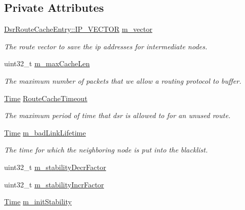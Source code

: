 \subsection*{Private Attributes}
\begin{DoxyCompactItemize}
\item 
\hyperlink{classns3_1_1dsr_1_1DsrRouteCacheEntry_ab834177006bdbfd2e3fa607c2a88cbdf}{Dsr\+Route\+Cache\+Entry\+::\+I\+P\+\_\+\+V\+E\+C\+T\+OR} \hyperlink{classns3_1_1dsr_1_1DsrRouteCache_a8f89664e7c7f0b9027462066f301f460}{m\+\_\+vector}
\begin{DoxyCompactList}\small\item\em The route vector to save the ip addresses for intermediate nodes. \end{DoxyCompactList}\item 
uint32\+\_\+t \hyperlink{classns3_1_1dsr_1_1DsrRouteCache_a7c2e4d18d325c59346bde655057682c2}{m\+\_\+max\+Cache\+Len}
\begin{DoxyCompactList}\small\item\em The maximum number of packets that we allow a routing protocol to buffer. \end{DoxyCompactList}\item 
\hyperlink{classns3_1_1Time}{Time} \hyperlink{classns3_1_1dsr_1_1DsrRouteCache_a6a2bdf2226910392a4578cc82216acaf}{Route\+Cache\+Timeout}
\begin{DoxyCompactList}\small\item\em The maximum period of time that dsr is allowed to for an unused route. \end{DoxyCompactList}\item 
\hyperlink{classns3_1_1Time}{Time} \hyperlink{classns3_1_1dsr_1_1DsrRouteCache_a7ab3daa7c72f3320d4eb70742a4c819d}{m\+\_\+bad\+Link\+Lifetime}
\begin{DoxyCompactList}\small\item\em The time for which the neighboring node is put into the blacklist. \end{DoxyCompactList}\item 
uint32\+\_\+t \hyperlink{classns3_1_1dsr_1_1DsrRouteCache_a019b992bfd50af4ce7a3d7e13bc0c38a}{m\+\_\+stability\+Decr\+Factor}
\item 
uint32\+\_\+t \hyperlink{classns3_1_1dsr_1_1DsrRouteCache_a4fb68651a11cfafbb027660a4b42734e}{m\+\_\+stability\+Incr\+Factor}
\item 
\hyperlink{classns3_1_1Time}{Time} \hyperlink{classns3_1_1dsr_1_1DsrRouteCache_a33fe450058c846a3ebdd386ad5a11208}{m\+\_\+init\+Stability}

\end{DoxyCompactItemize}
